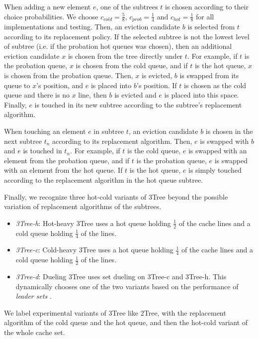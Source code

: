 \documentclass[letterpaper]{article}
\begin{document}
When adding a new element $e$, one of the subtrees $t$ is chosen according to their choice probabilities.
We choose $c_{cold} = \frac{5}{8}$, $c_{prob} = \frac{1}{4}$ and $c_{hot} = \frac{1}{8}$
for all implementations and testing.
Then, an eviction candidate $b$ is selected from $t$ according to its replacement policy.
If the selected subtree is not the lowest level of subtree (i.e. if the probation hot queues was chosen),
then an additional eviction candidate $x$ is chosen from the tree directly under $t$.
For example, if $t$ is the probation queue, $x$ is chosen from the cold queue,
and if $t$ is the hot queue, $x$ is chosen from the probation queue.
Then, $x$ is evicted, $b$ is swapped from its queue to $x$'s position, and $e$ is placed into $b$'s position.
If $t$ is chosen as the cold queue and there is no $x$ line, then $b$ is evicted and $e$ is placed into this space.
Finally, $e$ is touched in its new subtree according to the subtree's replacement algorithm.

When touching an element $e$ in subtree $t$,
an eviction candidate $b$ is chosen in the next subtree $t_n$ according to its replacement algorithm.
Then, $e$ is swapped with $b$ and $e$ is touched in $t_n$.
For example, if $t$ is the cold queue, $e$ is swapped with an element from the probation queue,
and if $t$ is the probation queue, $e$ is swapped with an element from the hot queue.
If $t$ is the hot queue, $e$ is simply touched according to the replacement algorithm in the hot queue subtree.

Finally, we recognize three hot-cold variants of 3Tree beyond the possible variation of replacement algorithms of the subtrees.
\begin{itemize}
	\item \textit{3Tree-h}: Hot-heavy 3Tree uses a hot queue holding $\frac{1}{2}$ of the cache lines
		and a cold queue holding $\frac{1}{4}$ of the lines.
	\item \textit{3Tree-c}: Cold-heavy 3Tree uses a hot queue holding $\frac{1}{4}$ of the cache lines
		and a cold queue holding $\frac{1}{2}$ of the lines.
	\item \textit{3Tree-d}: Dueling 3Tree uses set dueling on 3Tree-c and 3Tree-h.
		This dynamically chooses one of the two variants based on the performance of 
		\textit{leader sets} \cite{DuelingSLRU}.
\end{itemize}
We label experimental variants of 3Tree like 2Tree,
with the replacement algorithm of the cold queue and the hot queue,
and then the hot-cold variant of the whole cache set.
\end{document}
